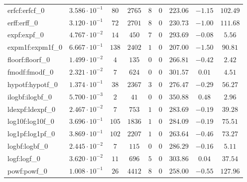 \begin{tabular}{|l|c|c|c|c|c|c|c|c|}
erfcf:erfcf\_0               & $ 3.586 \cdot 10^{-1} $ & $ 80     $ & $ 2765  $ & $ 8   $ & $ 0   $ & $ 223.06      $ & $ -1.15   $ & $ 102.49  $ \\
erff:erff\_0                 & $ 3.120 \cdot 10^{-1} $ & $ 72     $ & $ 2701  $ & $ 8   $ & $ 0   $ & $ 230.73      $ & $ -1.00   $ & $ 111.68  $ \\
expf:expf\_0                 & $ 4.767 \cdot 10^{-2} $ & $ 14     $ & $ 450   $ & $ 7   $ & $ 0   $ & $ 293.69      $ & $ -0.08   $ & $ 5.56    $ \\
expm1f:expm1f\_0             & $ 6.667 \cdot 10^{-1} $ & $ 138    $ & $ 2402  $ & $ 1   $ & $ 0   $ & $ 207.00      $ & $ -1.50   $ & $ 90.81   $ \\
floorf:floorf\_0             & $ 1.499 \cdot 10^{-2} $ & $ 4      $ & $ 135   $ & $ 0   $ & $ 0   $ & $ 266.81      $ & $ -0.42   $ & $ 2.42    $ \\
fmodf:fmodf\_0               & $ 2.321 \cdot 10^{-2} $ & $ 7      $ & $ 624   $ & $ 0   $ & $ 0   $ & $ 301.57      $ & $ 0.01    $ & $ 4.51    $ \\
hypotf:hypotf\_0             & $ 1.374 \cdot 10^{-1} $ & $ 38     $ & $ 2367  $ & $ 3   $ & $ 0   $ & $ 276.47      $ & $ -0.29   $ & $ 56.27   $ \\
ilogbf:ilogbf\_0             & $ 5.700 \cdot 10^{-3} $ & $ 2      $ & $ 41    $ & $ 0   $ & $ 0   $ & $ 350.88      $ & $ 0.48    $ & $ 2.96    $ \\
ldexpf:ldexpf\_0             & $ 2.467 \cdot 10^{-2} $ & $ 7      $ & $ 753   $ & $ 1   $ & $ 0   $ & $ 283.69      $ & $ -0.19   $ & $ 39.28   $ \\
log10f:log10f\_0             & $ 3.696 \cdot 10^{-1} $ & $ 105    $ & $ 1836  $ & $ 1   $ & $ 0   $ & $ 284.09      $ & $ -0.19   $ & $ 75.51   $ \\
log1pf:log1pf\_0             & $ 3.869 \cdot 10^{-1} $ & $ 102    $ & $ 2207  $ & $ 1   $ & $ 0   $ & $ 263.64      $ & $ -0.46   $ & $ 73.27   $ \\
logbf:logbf\_0               & $ 2.445 \cdot 10^{-2} $ & $ 7      $ & $ 115   $ & $ 0   $ & $ 0   $ & $ 286.29      $ & $ -0.16   $ & $ 5.11    $ \\
logf:logf\_0                 & $ 3.620 \cdot 10^{-2} $ & $ 11     $ & $ 696   $ & $ 5   $ & $ 0   $ & $ 303.86      $ & $ 0.04    $ & $ 37.54   $ \\
powf:powf\_0                 & $ 1.008 \cdot 10^{-1} $ & $ 26     $ & $ 4412  $ & $ 8   $ & $ 0   $ & $ 258.00      $ & $ -0.55   $ & $ 127.96  $ \\

\end{tabular}
